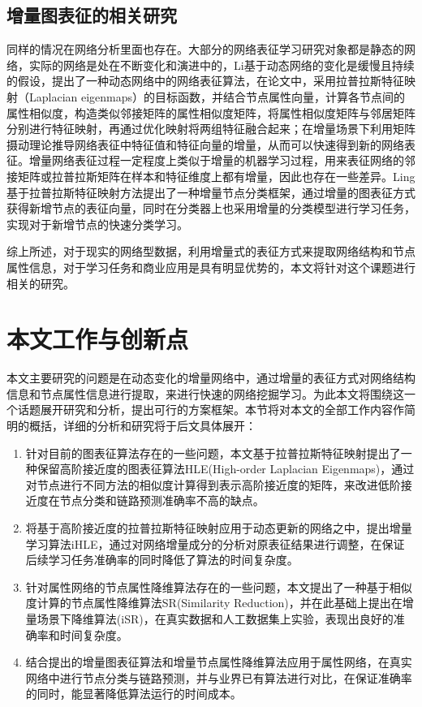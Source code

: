 \subsection {增量图表征的相关研究}
同样的情况在网络分析里面也存在。大部分的网络表征学习研究对象都是静态的网络，实际的网络是处在不断变化和演进中的，Li\cite{li2017attributed}基于动态网络的变化是缓慢且持续的假设，提出了一种动态网络中的网络表征算法，在论文中，采用拉普拉斯特征映射（Laplacian eigenmaps）的目标函数，并结合节点属性向量，计算各节点间的属性相似度，构造类似邻接矩阵的属性相似度矩阵，将属性相似度矩阵与邻居矩阵分别进行特征映射，再通过优化映射将两组特征融合起来；在增量场景下利用矩阵摄动理论推导网络表征中特征值和特征向量的增量，从而可以快速得到新的网络表征。增量网络表征过程一定程度上类似于增量的机器学习过程，用来表征网络的邻接矩阵或拉普拉斯矩阵在样本和特征维度上都有增量，因此也存在一些差异。Ling\cite{jian2018toward}基于拉普拉斯特征映射方法提出了一种增量节点分类框架，通过增量的图表征方式获得新增节点的表征向量，同时在分类器上也采用增量的分类模型进行学习任务，实现对于新增节点的快速分类学习。

综上所述，对于现实的网络型数据，利用增量式的表征方式来提取网络结构和节点属性信息，对于学习任务和商业应用是具有明显优势的，本文将针对这个课题进行相关的研究。




\section{本文工作与创新点}
本文主要研究的问题是在动态变化的增量网络中，通过增量的表征方式对网络结构信息和节点属性信息进行提取，来进行快速的网络挖掘学习。为此本文将围绕这一个话题展开研究和分析，提出可行的方案框架。本节将对本文的全部工作内容作简明的概括，详细的分析和研究将于后文具体展开：


\begin{enumerate}
	\item 针对目前的图表征算法存在的一些问题，本文基于拉普拉斯特征映射提出了一种保留高阶接近度的图表征算法HLE(High-order Laplacian Eigenmaps)，通过对节点进行不同方法的相似度计算得到表示高阶接近度的矩阵，来改进低阶接近度在节点分类和链路预测准确率不高的缺点。
	\item 将基于高阶接近度的拉普拉斯特征映射应用于动态更新的网络之中，提出增量学习算法iHLE，通过对网络增量成分的分析对原表征结果进行调整，在保证后续学习任务准确率的同时降低了算法的时间复杂度。
	\item 针对属性网络的节点属性降维算法存在的一些问题，本文提出了一种基于相似度计算的节点属性降维算法SR(Similarity Reduction)，并在此基础上提出在增量场景下降维算法(iSR)，在真实数据和人工数据集上实验，表现出良好的准确率和时间复杂度。
	\item 结合提出的增量图表征算法和增量节点属性降维算法应用于属性网络，在真实网络中进行节点分类与链路预测，并与业界已有算法进行对比，在保证准确率的同时，能显著降低算法运行的时间成本。
\end{enumerate}






